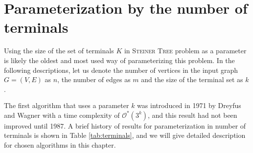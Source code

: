 \documentclass[thesis=M,english,hidelinks]{FITthesis}[2012/10/20]
\theoremstyle{definition}
\begin{document}

\chapter{Parameterization by the number of terminals}

Using the size of the set of terminals $K$ in \textsc{Steiner Tree} problem as a parameter is likely the oldest and most
used way of parameterizing this problem. In the following descriptions, let us denote the number of vertices in the input
graph $G = (V, E)$ as $n$, the number of edges as $m$ and the size of the terminal set as $k$.

The first algorithm that uses a parameter $k$ was introduced in 1971 by Dreyfus and Wagner \cite{Dreyfus1971} with a
time complexity of $\mathcal{O}^*(3^k)$, and this result had not been improved until 1987.  A brief history of results for
parameterization in number of terminals is shown in Table \ref{tab:terminals}, and we will give detailed description for
chosen algorithms in this chapter.
\end{document}
